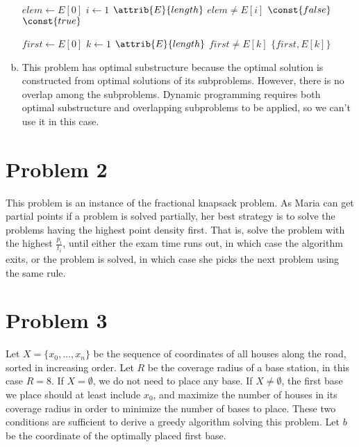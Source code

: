 \documentclass[a4paper, 10pt, twoside]{article}
\begin{document}
\begin{enumerate}[a)]
	      \begin{codebox}
		      \zi $elem \gets E[0]$
		      \zi \For $i \gets 1$ \To $\attrib{E}{length}$ \Do
		      \zi \If $elem \neq E[i]$
		      \zi \Then \Return $\const{false}$ \End \End
		      \zi \Return $\const{true}$ \End
	      \end{codebox}

	      \begin{codebox}
		      \Procname{$\proc{find-pair}(E)$}
		      \zi $first \gets E[0]$
		      \zi \For $k \gets 1$ \To $\attrib{E}{length}$ \Do
		      \zi \If $first \neq E[k]$
		      \zi \Then \Return $ \{ first, E[k] \} $ \End \End
	      \end{codebox}

	\item This problem has optimal substructure because the optimal solution is constructed from optimal solutions of its subproblems. However, there is no overlap among the subproblems. Dynamic programming requires both optimal substructure and overlapping subproblems to be applied, so we can't use it in this case.
\end{enumerate}

\section*{Problem 2}

This problem is an instance of the fractional knapsack problem. As Maria can get partial points if a problem is solved partially, her best strategy is to solve the problems having the highest point density first. That is, solve the problem with the highest $\frac{p_i}{t_i}$, until either the exam time runs out, in which case the algorithm exits, or the problem is solved, in which case she picks the next problem using the same rule.

\section*{Problem 3}

Let $X = \{ x_0, \ldots, x_n \}$ be the sequence of coordinates of all houses along the road, sorted in increasing order. Let $R$ be the coverage radius of a base station, in this case $R = 8$. If $X = \emptyset $, we do not need to place any base. If $X \neq \emptyset$, the first base we place should at least include $x_0$, and maximize the number of houses in its coverage radius in order to minimize the number of bases to place. These two conditions are sufficient to derive a greedy algorithm solving this problem. Let $b$ be the coordinate of the optimally placed first base.
\end{document}
